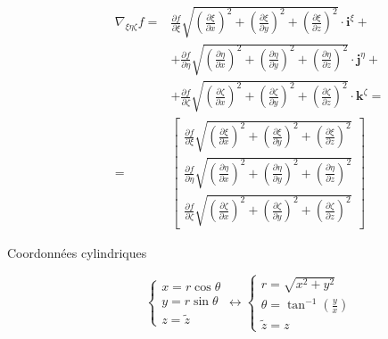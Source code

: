 \documentclass
[
a4paper,                      %
twoside,					  %
12pt,                         %
abstract,		      %
fleqn,                        %
]
{scrartcl} %
\begin{document}
\begin{description}
\begin{equation}
\begin{aligned}
\nabla_{\xi\eta\zeta} f=&\frac{\partial f}{\partial\xi}\sqrt{\left(\frac{\partial\xi}{\partial x}\right)^{2}+\left(\frac{\partial\xi}{\partial y}\right)^{2}+\left(\frac{\partial\xi}{\partial z}\right)^{2}}\cdot\mathbf{i}^{\xi}+\\
&+\frac{\partial f}{\partial\eta}\sqrt{\left(\frac{\partial\eta}{\partial x}\right)^{2}+\left(\frac{\partial\eta}{\partial y}\right)^{2}+\left(\frac{\partial\eta}{\partial z}\right)^{2}}\cdot\mathbf{j}^{\eta}+\\
&+\frac{\partial f}{\partial\zeta}\sqrt{\left(\frac{\partial\zeta}{\partial x}\right)^{2}+\left(\frac{\partial\zeta}{\partial y}\right)^{2}+\left(\frac{\partial\zeta}{\partial z}\right)^{2}}\cdot\mathbf{k}^{\zeta}=\\
=&\begin{bmatrix}
\frac{\partial f}{\partial\xi}\sqrt{\left(\frac{\partial\xi}{\partial x}\right)^{2}+\left(\frac{\partial\xi}{\partial y}\right)^{2}+\left(\frac{\partial\xi}{\partial z}\right)^{2}}\\[10pt]
\frac{\partial f}{\partial\eta}\sqrt{\left(\frac{\partial\eta}{\partial x}\right)^{2}+\left(\frac{\partial\eta}{\partial y}\right)^{2}+\left(\frac{\partial\eta}{\partial z}\right)^{2}}\\[10pt]
\frac{\partial f}{\partial\zeta}\sqrt{\left(\frac{\partial\zeta}{\partial x}\right)^{2}+\left(\frac{\partial\zeta}{\partial y}\right)^{2}+\left(\frac{\partial\zeta}{\partial z}\right)^{2}}
\end{bmatrix}
\end{aligned}
\end{equation}

\newpage

\item[Coordonn\'ees cylindriques]

\begin{equation}
\begin{cases}
x=r\cos{\theta}\\
y=r\sin{\theta}\\
z=\tilde{z}
\end{cases}\longleftrightarrow\begin{cases}
r=\sqrt{x^{2}+y^{2}}\\
\theta=\tan^{-1}\left(\frac{y}{x}\right)\\
\tilde{z}=z
\end{cases}
\end{equation}


\end{description}
\end{document}
